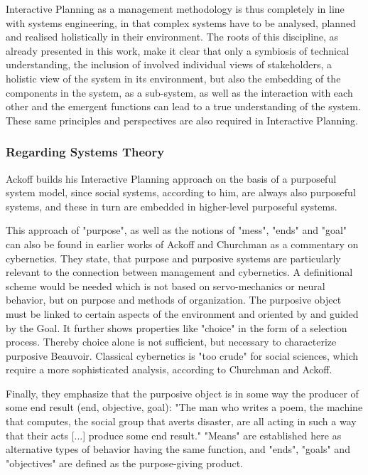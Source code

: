 \documentclass[a4paper,12pt]{scrartcl}
\begin{document}
Interactive Planning as a management methodology is thus completely in line with systems engineering, in that complex systems have to be analysed, planned and realised holistically in their environment. The roots of this discipline, as already presented in this work, make it clear that only a symbiosis of technical understanding, the inclusion of involved individual views of stakeholders, a holistic view of the system in its environment, but also the embedding of the components in the system, as a sub-system, as well as the interaction with each other and the emergent functions can lead to a true understanding of the system. These same principles and perspectives are also required in Interactive Planning.

\subsubsection{Regarding Systems Theory}	

Ackoff builds his Interactive Planning approach on the basis of a purposeful system model, since social systems, according to him, are always also purposeful systems, and these in turn are embedded in higher-level purposeful systems.\cite{jackson:2003}

This approach of "purpose", as well as the notions of "mess", "ends" and "goal" can also be found in earlier works of Ackoff and Churchman as a commentary on cybernetics. They state, that purpose and purposive systems are particularly relevant to the connection between management and cybernetics.
A definitional scheme would be needed which is not based on servo-mechanics or neural behavior, but on purpose and methods of organization. The purposive object must be linked to certain aspects of the environment and oriented by and guided by the Goal. It further shows properties like "choice" in the form of a selection process. Thereby choice alone is not sufficient, but necessary to characterize purposive Beauvoir. Classical cybernetics is "too crude" for social sciences, which require a more sophisticated analysis, according to Churchman and Ackoff.\cite{chruchman:1950}

Finally, they emphasize that the purposive object is in some way the producer of some end result (end, objective, goal): "The man who writes a poem, the machine that computes, the social group that averts disaster, are all acting in such a way that their acts [...] produce some end result."\cite{chruchman:1950}
"Means" are established here as alternative types of behavior having the same function, and "ends", "goals" and "objectives" are defined as the purpose-giving product.\cite{chruchman:1950}
\end{document}
